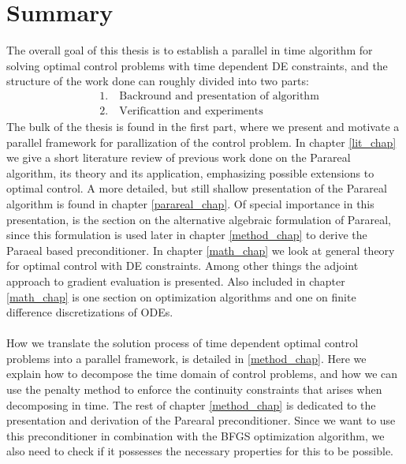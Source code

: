 \section{Summary}
The overall goal of this thesis is to establish a parallel in time algorithm for solving optimal control problems with time dependent DE constraints, and the structure of the work done can roughly divided into two parts:
\begin{align*}
&1.\quad \textrm{Backround and presentation of algorithm} \\
&2.\quad \textrm{Verificattion and experiments}
\end{align*}
The bulk of the thesis is found in the first part, where we present and motivate a parallel framework for parallization of the control problem. In chapter \ref{lit_chap} we give a short literature review of previous work done on the Parareal algorithm, its theory and its application, emphasizing possible extensions to optimal control. A more detailed, but still shallow presentation of the Parareal algorithm is found in chapter \ref{parareal_chap}. Of special importance in this presentation, is the section on the alternative algebraic formulation of Parareal, since this formulation is used later in chapter \ref{method_chap} to derive the Paraeal based preconditioner. In chapter \ref{math_chap} we look at general theory for optimal control with DE constraints. Among other things the adjoint approach to gradient evaluation is presented. Also included in chapter \ref{math_chap} is one section on optimization algorithms and one on finite difference discretizations of ODEs.
\\
\\
How we translate the solution process of time dependent optimal control problems into a parallel framework, is detailed in \ref{method_chap}. Here we explain how to decompose the time domain of control problems, and how we can use the penalty method to enforce the continuity constraints that arises when decomposing in time. The rest of chapter \ref{method_chap} is dedicated to the presentation and derivation of the Parearal preconditioner. Since we want to use this preconditioner in combination with the BFGS optimization algorithm, we also need to check if it possesses the necessary properties for this to be possible. 
\\
\\
